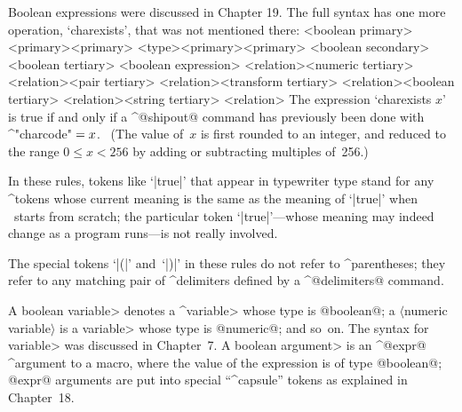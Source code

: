 \medbreak
\textindent\bull
Boolean expressions were discussed in Chapter 19. The full syntax has
one more operation, `charexists', that was not mentioned there:
\beginsyntax
<boolean primary>
 \alt[true]\alt[false]
 \alt[known]<primary>\alt[unknown]<primary>
 \alt<type><primary>\alt[cycle]<primary>
<boolean secondary>
<boolean tertiary>
<boolean expression>
 <relation><numeric tertiary>
 <relation><pair tertiary>
 <relation><transform tertiary>
 <relation><boolean tertiary>
 <relation><string tertiary>
<relation>\is[\char'74]\alt[\char'74=]\alt[>]\alt[>=]\alt[=]\alt[\char'74>]
\endsyntax
The expression `charexists $x$' is true if and only if a ^@shipout@
command has previously been done with ^"charcode"$\null=x$. \ (The value
of~$x$ is first rounded to an integer, and reduced to the range
$0\le x<256$ by adding or subtracting multiples of~256.)

In these rules, tokens like `|true|' that appear in typewriter type stand for
any ^{tokens} whose current meaning is the same as the meaning of `|true|'
when \MF\ starts from scratch; the particular token `|true|'---whose
meaning may indeed change as a program runs---is not really involved.

The special tokens `|(|' and~`|)|' in these rules do not refer to
^{parentheses}; they refer to any matching pair of ^{delimiters} defined
by a ^@delimiters@ command.

A \<boolean variable> denotes a ^\<variable> whose type is @boolean@; a
$\langle$numeric variable$\rangle$ is a \<variable> whose type is
@numeric@; and so~on.  The syntax for \<variable> was discussed in
Chapter~7. A \<boolean argument> is an ^@expr@ ^{argument} to a macro,
where the value of the expression is of type @boolean@;
@expr@ arguments are put into special ``^{capsule}''
tokens as explained in Chapter~18.

